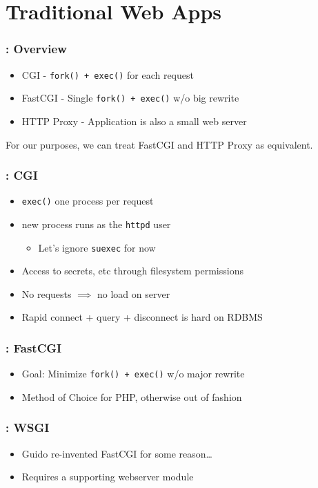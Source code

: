 \documentclass{beamer}
\begin{document}
\section{Traditional Web Apps}
\frame{\sectionpage}

\begin{frame}
	\frametitle{\insertsection : Overview}
	\begin{itemize}
		\pause \item CGI - \texttt{fork() + exec()} for each request
		\pause \item FastCGI - Single \texttt{fork() + exec()} w/o big rewrite
		\pause \item HTTP Proxy - Application is also a small web server
	\end{itemize}
	\pause For our purposes, we can treat FastCGI and HTTP Proxy as equivalent.
\end{frame}

\begin{frame}
	\frametitle{\insertsection : CGI}
	\begin{itemize}
		\pause \item \texttt{exec()} one process per request
		\pause \item new process runs as the \texttt{httpd} user
			\begin{itemize}
				\item Let's ignore \texttt{suexec} for now
			\end{itemize}
		\pause \item Access to secrets, etc through filesystem permissions
		\pause \item No requests $\implies$ no load on server
		\pause \item Rapid connect + query + disconnect is hard on RDBMS
	\end{itemize}
\end{frame}

\begin{frame}
	\frametitle{\insertsection : FastCGI}
	\begin{itemize}
		\pause \item Goal: Minimize \texttt{fork() + exec()} w/o major rewrite
		\pause \item Method of Choice for PHP, otherwise out of fashion
	\end{itemize}
\end{frame}

\begin{frame}
	\frametitle{\insertsection : WSGI}
	\begin{itemize}
		\pause \item Guido re-invented FastCGI for some reason\ldots
		\pause \item Requires a supporting webserver module
	\end{itemize}
\end{frame}
\end{document}
